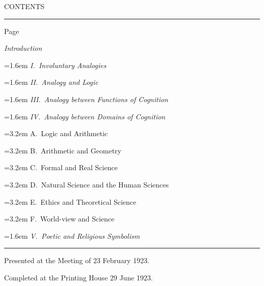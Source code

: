 \documentclass[12pt]{book}
\newcommand{\opage}[1]{\marginnote{\footnotesize\textit{[#1]}}}
\begin{document}
\clearpage
{\centering\large \opage{138}CONTENTS\par}
\vspace{0.6ex}
{\centering\rule{2.4cm}{0.4pt}\par}
\vspace{1.2ex}
\begingroup
\parindent=0pt
\setlength{\parskip}{0pt}
\small
\mbox{}\hfill Page\par
\emph{Introduction}\par
\hangindent=1.6em \emph{I.~Involuntary Analogies}\par
\hangindent=1.6em \emph{II.~Analogy and Logic}\par
\hangindent=1.6em \emph{III.~Analogy between Functions of Cognition}\par
\hangindent=1.6em \emph{IV.~Analogy between Domains of Cognition}\par
\hangindent=3.2em \hspace*{1.6em}A.~Logic and Arithmetic\par
\hangindent=3.2em \hspace*{1.6em}B.~Arithmetic and Geometry\par
\hangindent=3.2em \hspace*{1.6em}C.~Formal and Real Science\par
\hangindent=3.2em \hspace*{1.6em}D.~Natural Science and the Human Sciences\par
\hangindent=3.2em \hspace*{1.6em}E.~Ethics and Theoretical Science\par
\hangindent=3.2em \hspace*{1.6em}F.~World-view and Science\par
\hangindent=1.6em \emph{V.~Poetic and Religious Symbolism}\par
\endgroup
\vspace{5ex}
{\centering\rule{2.4cm}{0.4pt}\par}
\vspace{2ex}
{\centering\small Presented at the Meeting of 23 February 1923.\par
Completed at the Printing House 29 June 1923.\par}
\end{document}
